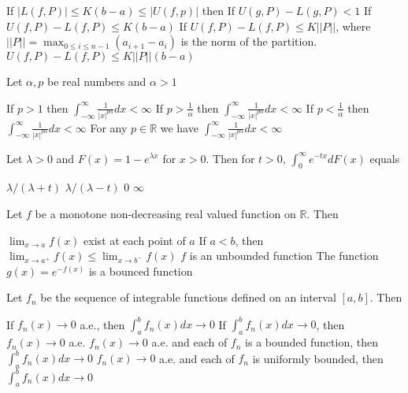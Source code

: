 \documentclass[10pt]{exam}
\newcommand{\R}{\ensuremath{\mathbb{R}}}
\begin{document}
\begin{questions}
\begin{choices}
\choice If $|L(f,P)| \leq K(b-a) \leq |U(f,p)|$ then If $U(g,P)-L(g,P)<1$
\choice If $U(f,P)-L(f,P) \leq K(b-a) $
\choice If $U(f,P)-L(f,P) \leq K ||P|| $, where $||P||=\max_{0 \leq i \leq n-1} (a_{i+1}-a_i)$ is the norm of the partition.
\choice$U(f,P)-L(f,P) \leq K||P||(b-a) $
\end{choices}


\question 
Let $\alpha, p$ be real numbers and $\alpha > 1$ 

\begin{choices}
\choice If $p > 1$ then $\int_{-\infty}^{\infty} \frac{1}{|x|^{p \alpha}} dx < \infty $ 
\choice If $p > \frac{1}{\alpha} $ then $\int_{-\infty}^{\infty} \frac{1}{|x|^{p \alpha}} dx < \infty $ 
\choice If $p < \frac{1}{\alpha} $ then $\int_{-\infty}^{\infty} \frac{1}{|x|^{p \alpha}} dx < \infty $ 
\choice For any  $p \in \R $ we have  $\int_{-\infty}^{\infty} \frac{1}{|x|^{p \alpha}} dx < \infty $ 
\end{choices}


\question
Let $\lambda > 0 $ and $F(x) = 1-e^{\lambda x}$ for $x>0$. Then for $t>0$, $\int_0^{\infty} e^{-tx} dF(x)$ equals

\begin{oneparchoices}
\choice $\lambda/(\lambda + t)$
\choice $\lambda/(\lambda - t)$
\choice $0$
\choice $\infty$
\end{oneparchoices}


\question
Let $f$ be a monotone non-decreasing real valued function on $\mathbb{R}$. Then 

\begin{choices}
\choice $\lim_{x \rightarrow a} f(x)$ exist at each point of $a$
\choice If $a<b$, then $\lim_{x \rightarrow a^{+}} f(x) \leq \lim_{x \rightarrow b^{-}} f(x)$ 
\choice $f$ is an unbounded function
\choice The function $g(x)=e^{-f(x)}$ is a bounced function
\end{choices}

\question
Let $f_n$ be the sequence of integrable functions defined on an interval $[a,b]$. Then

\begin{checkboxes}
\choice If $f_n(x) \rightarrow 0$ a.e., then $\int_a^b f_n(x)dx \rightarrow 0$
\choice If $\int_a^b f_n(x)dx \rightarrow 0$, then $f_n(x) \rightarrow 0$ a.e.
\choice $f_n(x) \rightarrow 0$ a.e. and each of $f_n$ is a bounded function, then $\int_a^b f_n(x)dx \rightarrow 0$
\choice $f_n(x) \rightarrow 0$ a.e. and each of $f_n$ is uniformly bounded, then $\int_a^b f_n(x)dx \rightarrow 0$
\end{checkboxes}


\end{questions}
\end{document}
